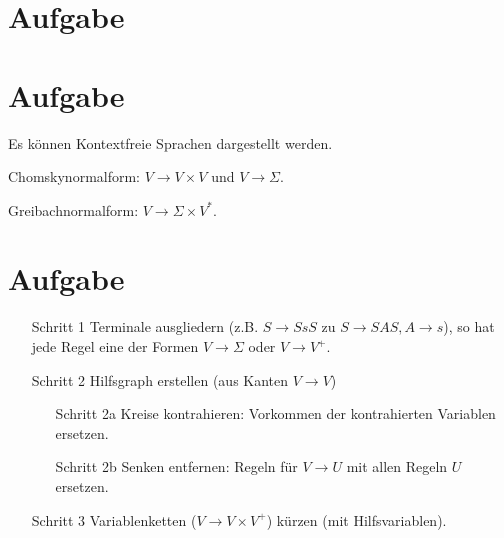 \documentclass{article}
\begin{document}
\section{Aufgabe}


\section{Aufgabe}
Es können Kontextfreie Sprachen dargestellt werden.

Chomskynormalform: $V \rightarrow V \times V$ und $V \rightarrow \Sigma$.

Greibachnormalform: $V \rightarrow \Sigma \times V^*$.



\section{Aufgabe}
\begin{enumerate}
	\item[Schritt 1] Terminale ausgliedern (z.B. $S \rightarrow SsS$ zu $S \rightarrow SAS, A \rightarrow s$), so hat jede Regel eine der Formen $V\rightarrow \Sigma$ oder $V\rightarrow V^+$.
  \item[Schritt 2] Hilfsgraph erstellen (aus Kanten $V \rightarrow V$)
  \begin{enumerate}
    \item[Schritt 2a] Kreise kontrahieren: Vorkommen der kontrahierten Variablen ersetzen.
    \item[Schritt 2b] Senken entfernen: Regeln für $V\rightarrow U$ mit allen Regeln $U$ ersetzen.
  \end{enumerate}
  \item[Schritt 3] Variablenketten ($V \rightarrow V \times V^+$) kürzen (mit Hilfsvariablen).
\end{enumerate}
\end{document}
